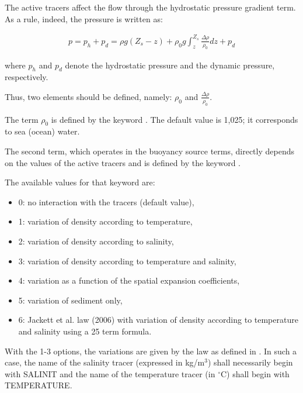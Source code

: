 The active tracers affect the flow through the hydrostatic pressure gradient
term. As a rule, indeed, the pressure is written as:

\begin{align}
p=p_{h} +p_{d} =\rho g(Z_{s} -z)+\rho _{0} g\int _{z}^{Z_{s} }\frac{\Delta \rho
}{\rho _{0} }  dz+p_{d}
\end{align}

where $p_{h} $ and $p_{d} $ denote the hydrostatic pressure and the dynamic
pressure, respectively.

Thus, two elements should be defined, namely: $\rho_{0} $ and $\frac{\Delta
\rho }{\rho _{0} } $.

The term $\rho _{0} $ is defined by the keyword .
The default value is 1,025; it corresponds to sea (ocean) water.

The second term, which operates in the buoyancy source terms, directly depends
on the values of the active tracers and is defined by the keyword
.

The available values for that keyword  are:

\begin{itemize}
\item  0: no interaction with the tracers (default value),

\item  1: variation of density according to temperature,

\item  2: variation of density according to salinity,

\item  3: variation of density according to temperature and salinity,

\item  4: variation as a function of the spatial expansion coefficients,

\item  5: variation of sediment only,

\item  6: Jackett et al. law (2006) with variation of density according to
          temperature and salinity using a 25 term formula.
\end{itemize}

With the 1-3 options, the variations are given by the law as defined in
. In such a case, the name of the salinity tracer (expressed in
kg/m${}^{3}$) shall necessarily begin with SALINIT and the name of the
temperature tracer (in ${}^\circ$C) shall begin with TEMPERATURE.


